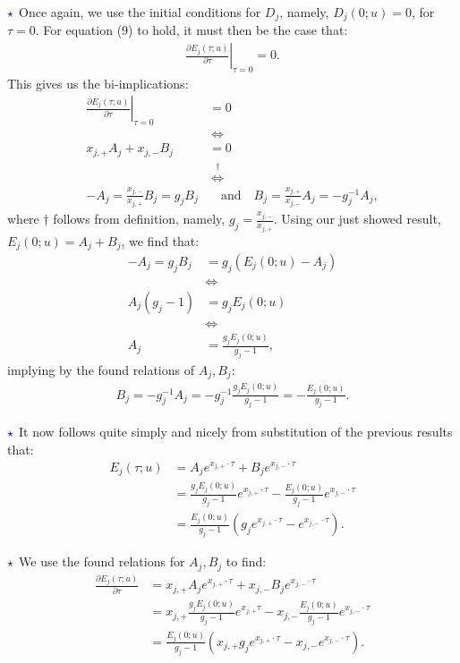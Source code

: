 \documentclass[12pt]{article}
\numberwithin{equation}{section}
\begin{document}
$\textcolor{blue}{\star}$ Once again, we use the initial conditions for $D_j$,
namely, $D_j(0;u)=0$, for $\tau=0$. For equation (9) to hold, it must then be the case
that:
\begin{align*}
    \left. \frac{\partial E_j(\tau;u)}{\partial \tau} \right|_{\tau=0}=0.
\end{align*}
This gives us the bi-implications:
\begin{align*}
    \left. \frac{\partial E_j(\tau;u)}{\partial \tau} \right|_{\tau=0}&=0\\
    &\:\iff\\
    x_{j,+} A_j+x_{j,-} B_j&=0\\
    \:&\:\overset{\dagger}{\iff}\\
    -A_j=\frac{x_{j,-}}{x_{j,+}}B_j=g_jB_j &\quad \text{and}\quad B_j=\frac{x_{j,+}}{x_{j,-}}A_j=-g_j^{-1}A_j,
\end{align*}
where $\dagger$ follows from definition, namely, $g_j=\frac{x_{j,-}}{x_{j,+}}$.
Using our just showed result, $E_j(0;u)=A_j+B_j$, we find that:
\begin{align*}
    -A_j=g_jB_j&=g_j(E_j(0;u)-A_j)\\
    &\iff\\
    A_j(g_j-1)&=g_jE_j(0;u)\\
    &\iff\\
    A_j&=\frac{g_jE_j(0;u)}{g_j-1},
\end{align*}
implying by the found relations of $A_j,B_j$:
\begin{align*}
    B_j=-g_j^{-1}A_j=-g_j^{-1}\frac{g_jE_j(0;u)}{g_j-1}=-\frac{E_j(0;u)}{g_j-1}.
\end{align*}

$\textcolor{blue}{\star}$ It now follows quite simply and nicely from
substitution of the
previous results that:
\begin{align*}
    E_j(\tau;u)&=A_je^{x_{j,+}\cdot \tau}+B_j e^{x_{j,-}\cdot \tau}\\
    &=\frac{g_jE_j(0;u)}{g_j-1}e^{x_{j,+}\cdot \tau}-\frac{E_j(0;u)}{g_j-1}e^{x_{j,-}\cdot \tau}\\
    &=\frac{E_j(0;u)}{g_j-1}\left ( g_je^{x_{j,+}\cdot \tau}-e^{x_{j,-}\cdot \tau}\right ).
\end{align*}

$\textcolor{blue}{\star}$ We use the found relations for $A_j,B_j$ to find: 
\begin{align*}
    \frac{\partial E_j(\tau;u)}{\partial \tau}&=x_{j,+}A_je^{x_{j,+}\cdot \tau}+x_{j,-}B_je^{x_{j,-}\cdot\tau}\\
    &=x_{j,+}\frac{g_jE_j(0;u)}{g_j-1}e^{x_{j,+}\tau}-x_{j,-}\frac{E_j(0;u)}{g_j-1}e^{x_{j,-}\cdot\tau}\\
    &=\frac{E_j(0;u)}{g_j-1}\left (x_{j,+}g_je^{x_{j,+}\cdot \tau} -x_{j,-}e^{x_{j,-}\cdot \tau}\right ).
\end{align*}
\end{document}
